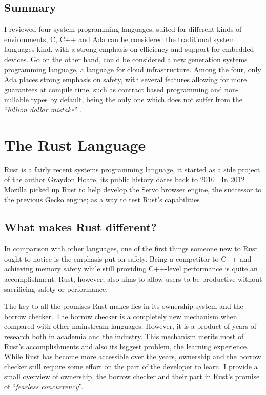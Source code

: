 \subsection{Summary}

I reviewed four system programming languages, suited for different kinds of environments,
C, C++ and Ada can be considered the traditional system languages kind, with a strong emphasis on efficiency
and support for embedded devices.
Go on the other hand, could be considered a new generation systems programming language, a language for cloud infrastructure.
Among the four, only Ada places strong emphasis on safety, with several features allowing for more guarantees at compile time,
such as contract based programming and non-nullable types by default,
being the only one which does not suffer from the “\emph{billion dollar mistake}” \autocite{Hoare2009}.

\section{The Rust Language}\label{sec:rust-lang}

Rust is a fairly recent systems programming language,
it started as a side project of the author Graydon Hoare,
its public history dates back to 2010 \autocite{Hoare2010}.
In 2012 Mozilla picked up Rust to help develop the Servo browser engine, the successor to the previous Gecko engine;
as a way to test Rust's capabilities \autocite{Klabnik2016}.

\subsection{What makes Rust different?}

In comparison with other languages, one of the first things someone new to Rust ought to notice is the emphasis put on safety.
Being a competitor to C++ and achieving memory safety while still providing C++-level performance is quite an accomplishment.
Rust, however, also aims to allow users to be productive without sacrificing safety or performance.

The key to all the promises Rust makes lies in its ownership system and the borrow checker.
The borrow checker is a completely new mechanism when compared with other mainstream languages.
However, it is a product of years of research both in academia and the industry.
This mechanism merits most of Rust's accomplishments and also its biggest problem, the learning experience.
While Rust has become more accessible over the years,
ownership and the borrow checker still require some effort on the part of the developer to learn.
I provide a small overview of ownership, the borrow checker and their part in Rust's promise of “\emph{fearless concurrency}”.


